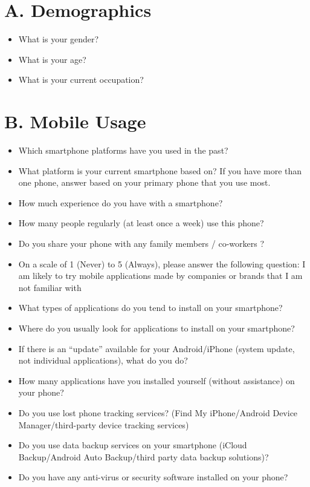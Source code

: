 \documentclass{sigchi}
\begin{document}
\appendix

\section{A. Demographics}
\begin{itemize}
\item What is your gender?
\item What is your age?
\item What is your current occupation?
\end{itemize}
\section{B. Mobile Usage}
\begin{itemize}
\item Which smartphone platforms have you used in the past?
\item What platform is your current smartphone based on? If you have more than one phone, answer based on your primary phone that you use most.
\item How much experience do you have with a smartphone?
\item How many people regularly (at least once a week) use this phone?
\item Do you share your phone with any family members / co-workers ?
\item On a scale of 1 (Never) to 5 (Always), please answer the following question: I am likely to try mobile applications made by companies or brands that I am not familiar with
\item What types of applications do you tend to install on your smartphone? 
\item Where do you usually look for applications to install on your smartphone?
\item If there is an “update” available for your Android/iPhone (system update, not individual applications), what do you do?
\item How many applications have you installed yourself (without assistance) on your phone?
\item Do you use lost phone tracking services? (Find My iPhone/Android Device Manager/third-party device tracking services)
\item Do you use data backup services on your smartphone (iCloud Backup/Android Auto Backup/third party data backup solutions)?
\item Do you have any anti-virus or security software installed on your phone? 
\end{itemize}
\end{document}
